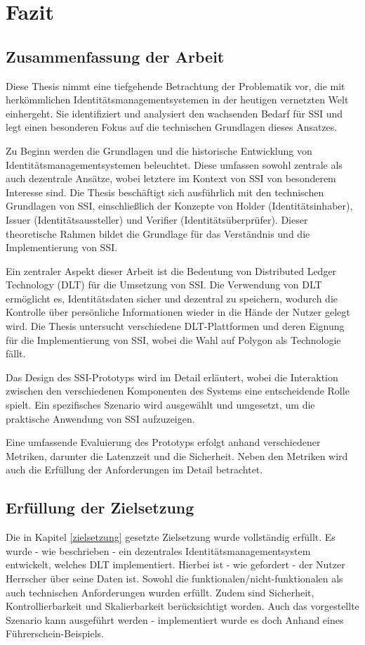 \chapter{Fazit}
\label{cha:fazit}

\section{Zusammenfassung der Arbeit}
Diese Thesis nimmt eine tiefgehende Betrachtung der Problematik vor, die mit herkömmlichen Identitätsmanagementsystemen in der heutigen vernetzten Welt einhergeht. Sie identifiziert und analysiert den wachsenden Bedarf für SSI und legt einen besonderen Fokus auf die technischen Grundlagen dieses Ansatzes.

Zu Beginn werden die Grundlagen und die historische Entwicklung von Identitätsmanagementsystemen beleuchtet. Diese umfassen sowohl zentrale als auch dezentrale Ansätze, wobei letztere im Kontext von SSI von besonderem Interesse sind. Die Thesis beschäftigt sich ausführlich mit den technischen Grundlagen von SSI, einschließlich der Konzepte von Holder (Identitätsinhaber), Issuer (Identitätsaussteller) und Verifier (Identitätsüberprüfer). Dieser theoretische Rahmen bildet die Grundlage für das Verständnis und die Implementierung von SSI.

Ein zentraler Aspekt dieser Arbeit ist die Bedeutung von Distributed Ledger Technology (DLT) für die Umsetzung von SSI. Die Verwendung von DLT ermöglicht es, Identitätsdaten sicher und dezentral zu speichern, wodurch die Kontrolle über persönliche Informationen wieder in die Hände der Nutzer gelegt wird. Die Thesis untersucht verschiedene DLT-Plattformen und deren Eignung für die Implementierung von SSI, wobei die Wahl auf Polygon als Technologie fällt.

Das Design des SSI-Prototyps wird im Detail erläutert, wobei die Interaktion zwischen den verschiedenen Komponenten des Systems eine entscheidende Rolle spielt. Ein spezifisches Szenario wird ausgewählt und umgesetzt, um die praktische Anwendung von SSI aufzuzeigen.

Eine umfassende Evaluierung des Prototyps erfolgt anhand verschiedener Metriken, darunter die Latenzzeit und die Sicherheit. Neben den Metriken wird auch die Erfüllung der Anforderungen im Detail betrachtet.

\section{Erfüllung der Zielsetzung}
Die in Kapitel \ref{zielsetzung} gesetzte Zielsetzung  wurde vollständig erfüllt. Es wurde - wie beschrieben - ein dezentrales Identitätsmanagementsystem entwickelt, welches DLT implementiert. Hierbei ist - wie gefordert - der Nutzer Herrscher über seine Daten ist. Sowohl die funktionalen/nicht-funktionalen als auch technischen Anforderungen wurden erfüllt. Zudem sind Sicherheit, Kontrollierbarkeit und Skalierbarkeit berücksichtigt worden. Auch das vorgestellte Szenario kann ausgeführt werden - implementiert wurde es doch Anhand eines Führerschein-Beispiels.


